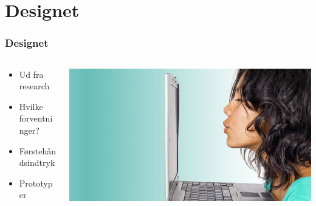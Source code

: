 \documentclass{beamer}
\begin{document}
\section{Designet}
\begin{frame}
  \frametitle{Designet}
  \begin{columns}[T]
    \begin{column}{0.5\textwidth}
      \begin{itemize}
	    \item Ud fra research
	    \item Hvilke forventninger?
	    \item Førstehåndsindtryk
	    \item Prototyper
      \end{itemize}  
    \end{column}
    \begin{column}{.5\textwidth}
      \includegraphics[width=\textwidth]{loveit.jpg}
    \end{column}
  \end{columns}
\end{frame}
\end{document}
